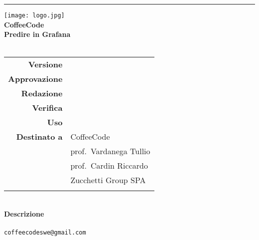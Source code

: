 
\begin{titlepage}%

  \raggedleft%
  \rule{1pt}{\textheight}%
  \hspace{0.05\textwidth}%
  \parbox[b]{0.75\textwidth}{%
  {\hspace{0.15\textwidth}\texttt{[image: logo.jpg]}}\\[2\baselineskip] %
  {\Huge\bfseries CoffeeCode \\[0.5\baselineskip] Predire in Grafana}\\[5\baselineskip] %
  {\Large\textsc{\placeholderTitle{}}}\\[6\baselineskip] %
  {\begin{tabular}{r l}
    \textbf{Versione}     & \versione{}               \\
    \textbf{Approvazione} & \responsabile{}           \\
    \textbf{Redazione}    & \redattori{}              \\
    \textbf{Verifica}     & \verificatori{}           \\
    \textbf{Uso}          & \uso{}                    \\
    \textbf{Destinato a}  & CoffeeCode                \\
                          & prof.\ Vardanega Tullio   \\
                          & prof.\ Cardin Riccardo    \\
    \ifthenelse{\equal{\uso}{Esterno}}{
                          & Zucchetti Group SPA       \\
    }{}
  \end{tabular}}\\[5\baselineskip]

  {\bfseries Descrizione}\\
  {\descrizione{}}\\[2\baselineskip]
  {\texttt{coffeecodeswe@gmail.com}}\\[\baselineskip] %
  }

\end{titlepage}
